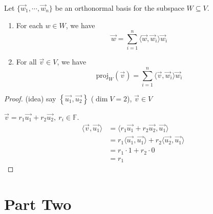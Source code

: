 \documentclass[11pt,fleqn]{book} %
\begin{document}
\begin{proposition}
    Let $\{ \vec{w}_1, \cdots, \vec{w}_n \}$ be an orthonormal basis for the subspace $W \subseteq V$. 
    
    \begin{enumerate}[label=\alph*)]
        \item For each $w \in W$, we have $$\vec{w} = \sum_{i=1}^n \langle \vec{w}, \vec{w}_i \rangle \vec{w}_i$$
        \item For all $\vec{v} \in V$, we have $$\mathrm{proj}_W(\vec{v}) = \sum_{i=1}^n \langle \vec{v}, \vec{w}_i \rangle \vec{w}_i$$
    \end{enumerate}
\end{proposition}
\setcounter{chapter}{3}

\begin{proof}
    (idea) say $\left\{ \overrightarrow{u_1}, \overrightarrow{u_2} \right\}$ ($\dim V = 2$), $\overrightarrow{v} \in V$

    $\overrightarrow{v} = r_1\overrightarrow{u_1} + r_2\overrightarrow{u_2},~ r_i \in \mathbb{F}$. 
    \begin{align*}
        \langle \overrightarrow{v}, \overrightarrow{u_1} \rangle
        &= \langle r_1\overrightarrow{u_1} + r_2\overrightarrow{u_2}, \overrightarrow{u_1} \rangle
        \\
        &= r_1\langle \overrightarrow{u_1}, \overrightarrow{u_1} \rangle + r_2 \langle \overrightarrow{u_2}, \overrightarrow{u_1} \rangle
        \\
        &= r_1 \cdot 1 + r_2 \cdot 0
        \\
        &= r_1
    \end{align*}
\end{proof}


\part{Part Two}



\end{document}
